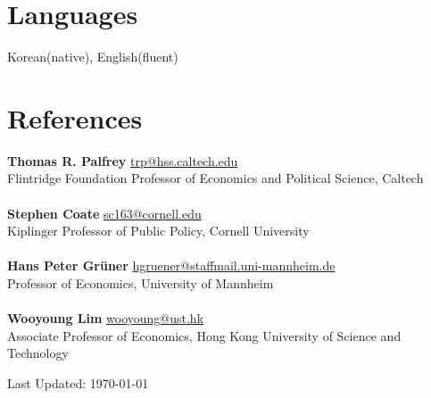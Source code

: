 \documentclass[margin, a4paper]{res}
\begin{document}
\begin{resume}
\section{Languages} Korean(native), English(fluent)

\section{References} \textbf{Thomas R. Palfrey} \href{mailto:trp@hss.caltech.edu}{trp@hss.caltech.edu}\\
Flintridge Foundation Professor of Economics and Political Science, Caltech\\\\
\textbf{Stephen Coate} \href{mailto:sc163@cornell.edu}{sc163@cornell.edu}\\
Kiplinger Professor of Public Policy, Cornell University\\\\
\textbf{Hans Peter Gr\"{u}ner} \href{mailto:hgruener@staffmail.uni-mannheim.de}{hgruener@staffmail.uni-mannheim.de}\\
Professor of Economics, University of Mannheim\\\\
\textbf{Wooyoung Lim} \href{mailto:wooyoung@ust.hk}{wooyoung@ust.hk}\\
Associate Professor of Economics, Hong Kong University of Science and Technology
\begin{flushright}
Last Updated: \today
\end{flushright}
\end{resume} 
\end{document}
